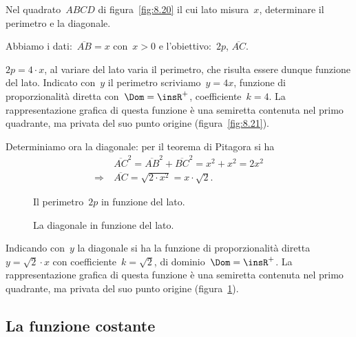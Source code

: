 \begin{problema}
\label{ex:8.21}
Nel quadrato~$ABCD$ di figura~\ref{fig:8.20} il cui lato misura~$x$, determinare il perimetro e la diagonale.
\end{problema}
\begin{soluzione}
 Abbiamo i dati:~$\overline{AB}=x$ con~$x>0$ e l'obiettivo:~$2p$, $\overline{AC}$.

 $2p=4\cdot x$, al variare del lato varia il perimetro, che risulta essere dunque funzione del lato.
Indicato con~$y$ il perimetro scriviamo~$y=4x$, funzione di proporzionalità diretta con~$\Dom=\insR^{+}$,
coefficiente~$k=4$. La rappresentazione grafica di questa funzione è una semiretta contenuta nel primo quadrante,
ma privata del suo punto origine (figura~\ref{fig:8.21}).

Determiniamo ora la diagonale: per il teorema di Pitagora si ha
\begin{align*}
 &\overline{AC}^{2}=\overline{AB}^{2}+\overline{BC}^{2}=x^{2}+x^{2}=2x^{2}\\
 \Rightarrow\:&\overline{AC}=\sqrt{2\cdot x^{2}}=x\cdot \sqrt{2}.
\end{align*}

\begin{figure}[htb]
 \begin{minipage}[b]{.45\textwidth}
  \centering
  \caption{Il perimetro~$2p$ in funzione del lato.}\label{fig:8.21}
 \end{minipage}\hfil
 \begin{minipage}[b]{.45\textwidth}
  \centering
  \caption{La diagonale in funzione del lato.}\label{fig:8.22}
 \end{minipage}
\end{figure}

Indicando con~$y$ la diagonale si ha la funzione di proporzionalità diretta~$y=\sqrt{2}\cdot x$
con coefficiente~$k=\sqrt{2}$, di dominio~$\Dom=\insR^{+}$.
La rappresentazione grafica di questa funzione è una semiretta contenuta nel primo quadrante, ma privata del suo punto origine (figura~\ref{fig:8.22}).
\end{soluzione}

\vspazio\ovalbox{\risolvii \ref{ese:8.41}, \ref{ese:8.42}, \ref{ese:8.43}, \ref{ese:8.44}, \ref{ese:8.45}}
\pagebreak
\subsection{La funzione costante}

